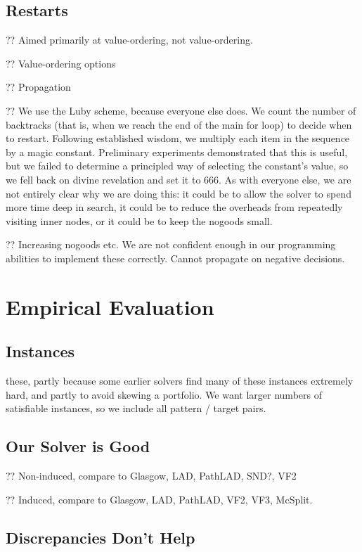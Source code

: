 \documentclass{article}
\begin{document}
\subsection{Restarts}

?? Aimed primarily at value-ordering, not value-ordering.

?? Value-ordering options

?? Propagation

?? We use the Luby scheme, because everyone else does. We count the number of backtracks (that is,
when we reach the end of the main for loop) to decide when to restart. Following established wisdom,
we multiply each item in the sequence by a magic constant. Preliminary experiments demonstrated that
this is useful, but we failed to determine a principled way of selecting the constant's value, so we
fell back on divine revelation and set it to 666. As with everyone else, we are not entirely clear
why we are doing this: it could be to allow the solver to spend more time deep in search, it could
be to reduce the overheads from repeatedly visiting inner nodes, or it could be to keep the nogoods
small.

?? Increasing nogoods etc. We are not confident enough in our programming abilities to implement
these correctly. Cannot propagate on negative decisions.

\section{Empirical Evaluation}

\subsection{Instances}

these, partly because some earlier solvers find many of these instances extremely hard, and partly
to avoid skewing a portfolio. We want larger numbers of satisfiable instances, so we include all
pattern / target pairs.

\subsection{Our Solver is Good}

?? Non-induced, compare to Glasgow, LAD, PathLAD, SND?, VF2

?? Induced, compare to Glasgow, LAD, PathLAD, VF2, VF3, McSplit.

\subsection{Discrepancies Don't Help}
\end{document}

